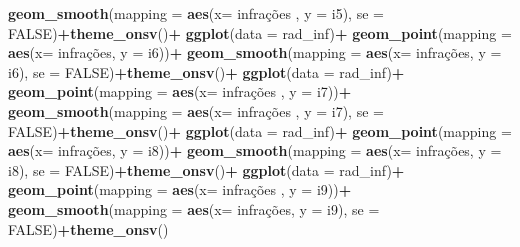 \documentclass[
]{book}
\newenvironment{Shaded}{\begin{snugshade}}{\end{snugshade}}
\newcommand{\AttributeTok}[1]{\textcolor[rgb]{0.13,0.29,0.53}{#1}}
\newcommand{\ConstantTok}[1]{\textcolor[rgb]{0.56,0.35,0.01}{#1}}
\newcommand{\FunctionTok}[1]{\textcolor[rgb]{0.13,0.29,0.53}{\textbf{#1}}}
\newcommand{\NormalTok}[1]{#1}
\newcommand{\SpecialCharTok}[1]{\textcolor[rgb]{0.81,0.36,0.00}{\textbf{#1}}}
\begin{document}
\begin{Shaded}
\begin{Highlighting}[]
  \FunctionTok{geom\_smooth}\NormalTok{(}\AttributeTok{mapping =} \FunctionTok{aes}\NormalTok{(}\AttributeTok{x=}\NormalTok{ infrações , }\AttributeTok{y =}\NormalTok{ i5), }\AttributeTok{se =} \ConstantTok{FALSE}\NormalTok{)}\SpecialCharTok{+}\FunctionTok{theme\_onsv}\NormalTok{()}\SpecialCharTok{+}
  \FunctionTok{ggplot}\NormalTok{(}\AttributeTok{data =}\NormalTok{ rad\_inf)}\SpecialCharTok{+}
  \FunctionTok{geom\_point}\NormalTok{(}\AttributeTok{mapping =} \FunctionTok{aes}\NormalTok{(}\AttributeTok{x=}\NormalTok{ infrações, }\AttributeTok{y =}\NormalTok{ i6))}\SpecialCharTok{+}
  \FunctionTok{geom\_smooth}\NormalTok{(}\AttributeTok{mapping =} \FunctionTok{aes}\NormalTok{(}\AttributeTok{x=}\NormalTok{ infrações, }\AttributeTok{y =}\NormalTok{ i6), }\AttributeTok{se =} \ConstantTok{FALSE}\NormalTok{)}\SpecialCharTok{+}\FunctionTok{theme\_onsv}\NormalTok{()}\SpecialCharTok{+}
  \FunctionTok{ggplot}\NormalTok{(}\AttributeTok{data =}\NormalTok{ rad\_inf)}\SpecialCharTok{+}
  \FunctionTok{geom\_point}\NormalTok{(}\AttributeTok{mapping =} \FunctionTok{aes}\NormalTok{(}\AttributeTok{x=}\NormalTok{ infrações , }\AttributeTok{y =}\NormalTok{ i7))}\SpecialCharTok{+}
  \FunctionTok{geom\_smooth}\NormalTok{(}\AttributeTok{mapping =} \FunctionTok{aes}\NormalTok{(}\AttributeTok{x=}\NormalTok{ infrações , }\AttributeTok{y =}\NormalTok{ i7), }\AttributeTok{se =} \ConstantTok{FALSE}\NormalTok{)}\SpecialCharTok{+}\FunctionTok{theme\_onsv}\NormalTok{()}\SpecialCharTok{+}
  \FunctionTok{ggplot}\NormalTok{(}\AttributeTok{data =}\NormalTok{ rad\_inf)}\SpecialCharTok{+}
  \FunctionTok{geom\_point}\NormalTok{(}\AttributeTok{mapping =} \FunctionTok{aes}\NormalTok{(}\AttributeTok{x=}\NormalTok{ infrações, }\AttributeTok{y =}\NormalTok{ i8))}\SpecialCharTok{+}
  \FunctionTok{geom\_smooth}\NormalTok{(}\AttributeTok{mapping =} \FunctionTok{aes}\NormalTok{(}\AttributeTok{x=}\NormalTok{ infrações, }\AttributeTok{y =}\NormalTok{ i8), }\AttributeTok{se =} \ConstantTok{FALSE}\NormalTok{)}\SpecialCharTok{+}\FunctionTok{theme\_onsv}\NormalTok{()}\SpecialCharTok{+}
  \FunctionTok{ggplot}\NormalTok{(}\AttributeTok{data =}\NormalTok{ rad\_inf)}\SpecialCharTok{+}
  \FunctionTok{geom\_point}\NormalTok{(}\AttributeTok{mapping =} \FunctionTok{aes}\NormalTok{(}\AttributeTok{x=}\NormalTok{ infrações , }\AttributeTok{y =}\NormalTok{ i9))}\SpecialCharTok{+}
  \FunctionTok{geom\_smooth}\NormalTok{(}\AttributeTok{mapping =} \FunctionTok{aes}\NormalTok{(}\AttributeTok{x=}\NormalTok{ infrações, }\AttributeTok{y =}\NormalTok{ i9), }\AttributeTok{se =} \ConstantTok{FALSE}\NormalTok{)}\SpecialCharTok{+}\FunctionTok{theme\_onsv}\NormalTok{()}
\end{Highlighting}
\end{Shaded}
\end{document}
